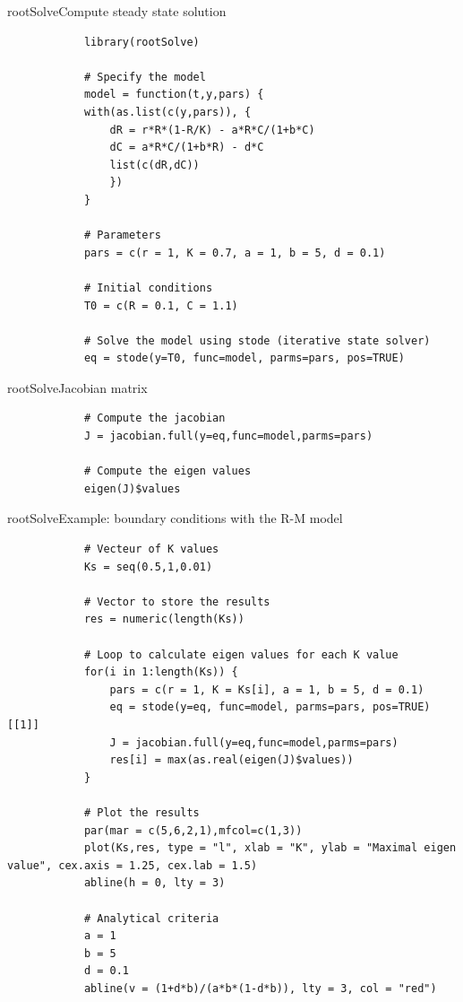 \documentclass{eecslides}
\begin{document}

	\begin{frame}[fragile]{rootSolve}{Compute steady state solution}
		\begin{lstlisting}
			library(rootSolve)
	
			# Specify the model
			model = function(t,y,pars) {
			with(as.list(c(y,pars)), {
				dR = r*R*(1-R/K) - a*R*C/(1+b*C)
				dC = a*R*C/(1+b*R) - d*C 		
				list(c(dR,dC))
				})
			}

			# Parameters
			pars = c(r = 1, K = 0.7, a = 1, b = 5, d = 0.1)	

			# Initial conditions
			T0 = c(R = 0.1, C = 1.1)
 	
			# Solve the model using stode (iterative state solver)
			eq = stode(y=T0, func=model, parms=pars, pos=TRUE)
		\end{lstlisting}

	\end{frame}


	\begin{frame}[fragile]{rootSolve}{Jacobian matrix}
		\begin{lstlisting}
			# Compute the jacobian
			J = jacobian.full(y=eq,func=model,parms=pars)
		
			# Compute the eigen values
			eigen(J)$values
		\end{lstlisting}
	\end{frame}


	\begin{frame}[fragile]{rootSolve}{Example: boundary conditions with the R-M model}

		\begin{lstlisting}
			# Vecteur of K values
			Ks = seq(0.5,1,0.01)

			# Vector to store the results
			res = numeric(length(Ks))

			# Loop to calculate eigen values for each K value
			for(i in 1:length(Ks)) {	
				pars = c(r = 1, K = Ks[i], a = 1, b = 5, d = 0.1)
				eq = stode(y=eq, func=model, parms=pars, pos=TRUE)[[1]]
				J = jacobian.full(y=eq,func=model,parms=pars)
				res[i] = max(as.real(eigen(J)$values))
			}
	
			# Plot the results
			par(mar = c(5,6,2,1),mfcol=c(1,3))
			plot(Ks,res, type = "l", xlab = "K", ylab = "Maximal eigen value", cex.axis = 1.25, cex.lab = 1.5)
			abline(h = 0, lty = 3)

			# Analytical criteria
			a = 1
			b = 5
			d = 0.1
			abline(v = (1+d*b)/(a*b*(1-d*b)), lty = 3, col = "red")
		\end{lstlisting}

	\end{frame}
\end{document}

